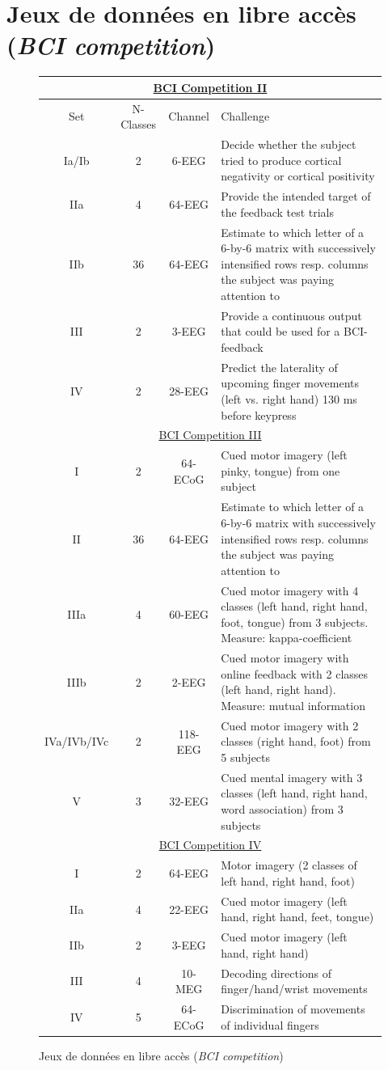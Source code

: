 \section{Jeux de donn\'{e}es en libre acc\`{e}s (\textit{BCI competition})}
\begin{figure}[H]
	\begin{tabular}{|c|c|c|p{8cm}|}
		\hline
		\multicolumn{4}{|c|}{\href{http://www.bbci.de/competition/ii/}{BCI Competition II}} \tabularnewline
		\hline
		Set & N-Classes & Channel & Challenge \tabularnewline
		\hline
		Ia/Ib & 2 & 6-EEG & Decide whether the subject tried to produce cortical negativity or cortical positivity \tabularnewline
		\hline
		IIa & 4 & 64-EEG & Provide the intended target of the feedback test trials  \tabularnewline
		\hline
		IIb & 36 & 64-EEG & Estimate to which letter of a 6-by-6 matrix with successively intensified rows resp. columns the subject was paying attention to  \tabularnewline
		\hline
		III & 2 & 3-EEG & Provide a continuous output that could be used for a BCI- feedback \tabularnewline
		\hline
		IV & 2 & 28-EEG & Predict the laterality of upcoming finger movements (left vs. right hand) 130 ms before keypress \tabularnewline
		\hline

		\multicolumn{4}{|c|}{\href{http://www.bbci.de/competition/iii/}{BCI Competition III}} \tabularnewline
		\hline
		I & 2 & 64-ECoG & Cued motor imagery (left pinky, tongue) from one subject \tabularnewline
		\hline
		II & 36 & 64-EEG & Estimate to which letter of a 6-by-6 matrix with successively intensified rows resp. columns the subject was paying attention to \tabularnewline
		\hline
		IIIa & 4 & 60-EEG & Cued motor imagery with 4 classes (left hand, right hand, foot, tongue) from 3 subjects. Measure: kappa-coefficient \tabularnewline
		\hline
		IIIb & 2 & 2-EEG & Cued motor imagery with online feedback with 2 classes (left hand, right hand). Measure: mutual information \tabularnewline
		\hline
		IVa/IVb/IVc & 2 & 118-EEG & Cued motor imagery with 2 classes (right hand, foot) from 5 subjects \tabularnewline
		\hline
		V & 3 & 32-EEG & Cued mental imagery with 3 classes (left hand, right hand, word association) from 3 subjects \tabularnewline
		\hline
	
		\multicolumn{4}{|c|}{\href{http://www.bbci.de/competition/iv/}{BCI Competition IV}} \tabularnewline
		\hline
		I & 2 & 64-EEG & Motor imagery (2 classes of left hand, right hand, foot) \tabularnewline
		\hline
		IIa & 4 & 22-EEG & Cued motor imagery (left hand, right hand, feet, tongue)   \tabularnewline
		\hline
		IIb & 2 & 3-EEG & Cued motor imagery (left hand, right hand)   \tabularnewline
		\hline
		III & 4 & 10-MEG & Decoding directions of finger/hand/wrist movements \tabularnewline
		\hline
		IV & 5 & 64-ECoG & Discrimination of movements of individual fingers \tabularnewline
		\hline
	\end{tabular}
	\caption{Jeux de donn\'{e}es en libre acc\`{e}s (\textit{BCI competition})}
	\label{annexe_bci_competition}
\end{figure}

